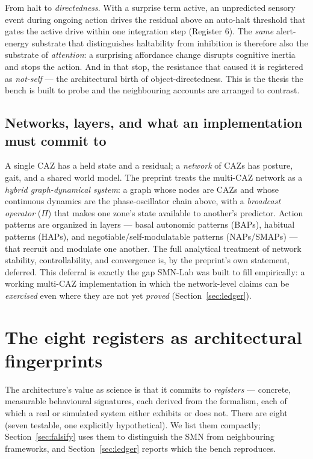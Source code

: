 \documentclass[utf8]{FrontiersinHarvard} %
\begin{document}
From halt to \emph{directedness}. With a surprise term active, an unpredicted sensory event during ongoing action drives the residual above an auto-halt threshold that gates the active drive within one integration step (Register 6). The \emph{same} alert-energy substrate that distinguishes haltability from inhibition is therefore also the substrate of \emph{attention}: a surprising affordance change disrupts cognitive inertia and stops the action. And in that stop, the resistance that caused it is registered as \emph{not-self} --- the architectural birth of object-directedness. This is the thesis the bench is built to probe and the neighbouring accounts are arranged to contrast.

\subsection{Networks, layers, and what an implementation must commit to}
A single CAZ has a held state and a residual; a \emph{network} of CAZs has posture, gait, and a shared world model. The preprint treats the multi-CAZ network as a \emph{hybrid graph-dynamical system}: a graph whose nodes are CAZs and whose continuous dynamics are the phase-oscillator chain above, with a \emph{broadcast operator} ($\Pi$) that makes one zone's state available to another's predictor. Action patterns are organized in layers --- basal autonomic patterns (BAPs), habitual patterns (HAPs), and negotiable/self-modulatable patterns (NAPs/SMAPs) --- that recruit and modulate one another. The full analytical treatment of network stability, controllability, and convergence is, by the preprint's own statement, deferred. This deferral is exactly the gap SMN-Lab was built to fill empirically: a working multi-CAZ implementation in which the network-level claims can be \emph{exercised} even where they are not yet \emph{proved} (Section~\ref{sec:ledger}).

\section{The eight registers as architectural fingerprints}\label{sec:registers}

The architecture's value as science is that it commits to \emph{registers} --- concrete, measurable behavioural signatures, each derived from the formalism, each of which a real or simulated system either exhibits or does not. There are eight (seven testable, one explicitly hypothetical). We list them compactly; Section~\ref{sec:falsify} uses them to distinguish the SMN from neighbouring frameworks, and Section~\ref{sec:ledger} reports which the bench reproduces.
\end{document}
